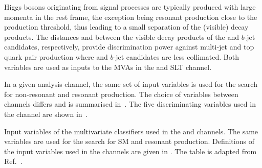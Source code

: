 Higgs bosons originating from signal processes are typically produced
with large momenta in the \HH rest frame, the exception being resonant
\HH production \mX close to the \HH production threshold, thus leading
to a small separation of the (visible) \PHiggs decay products. The
distances \dRtautau and \dRbb between the visible decay products of
the \tauleptons and $b$-jet candidates, respectively, provide
discrimination power against multi-jet and top quark pair production
where \tauleptons and $b$-jet candidates are less collimated. Both
variables are used as inputs to the MVAs in the \hadhad and \lephad
SLT channel.

In a given analysis channel, the same set of input variables is used
for the search for non-resonant and resonant \HH production. The
choice of variables between channels differs and is summarised
in~. The five discriminating variables used in
the \hadhad channel are shown in~.

\begin{table}[htbp]
  \centering

  \caption{Input variables of the multivariate classifiers used in the
    \hadhad and \lephad channels. The same variables are used for the
    search for SM \HH and resonant \HH production. Definitions of the
    input variables used in the \lephad channels are given in
    . The table is adapted from
    Ref.~\cite{ATLAS-CONF-2021-030}.}%
  \label{tab:mva_inputvar}

  \renewcommand{\arraystretch}{1.1}%
  
\end{table}


